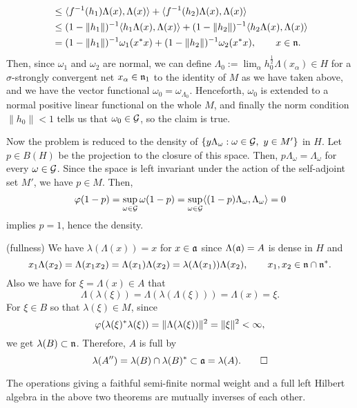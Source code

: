 \documentclass{../../small}
\begin{document}
\begin{pf}
\begin{align*}
&\le\langle f^{-1}(h_1)\Lambda(x),\Lambda(x)\rangle+\langle f^{-1}(h_2)\Lambda(x),\Lambda(x)\rangle\\
&\le(1-\|h_1\|)^{-1}\langle h_1\Lambda(x),\Lambda(x)\rangle+(1-\|h_2\|)^{-1}\langle h_2\Lambda(x),\Lambda(x)\rangle\\
&=(1-\|h_1\|)^{-1}\omega_1(x^*x)+(1-\|h_2\|)^{-1}\omega_2(x^*x),\qquad x\in\mathfrak{n}.
\end{align*}
Then, since $\omega_1$ and $\omega_2$ are normal, we can define $\Lambda_0:=\lim_\alpha h_0^{\frac12}\Lambda(x_\alpha)\in H$ for a $\sigma$-strongly convergent net $x_\alpha\in\mathfrak{n}_1$ to the identity of $M$ as we have taken above, and we have the vector functional $\omega_0=\omega_{\Lambda_0}$.
Henceforth, $\omega_0$ is extended to a normal positive linear functional on the whole $M$, and finally the norm condition $\|h_0\|<1$ tells us that $\omega_0\in\mathcal{G}$, so the claim is true.

Now the problem is reduced to the density of $\{y\Lambda_{\omega}:\omega\in\mathcal{G},\ y\in M'\}$ in $H$.
Let $p\in B(H)$ be the projection to the closure of this space.
Then, $p\Lambda_\omega=\Lambda_\omega$ for every $\omega\in\mathcal{G}$.
Since the space is left invariant under the action of the self-adjoint set $M'$, we have $p\in M$.
Then,
\[\varphi(1-p)=\sup_{\omega\in\mathcal{G}}\omega(1-p)=\sup_{\omega\in\mathcal{G}}\langle(1-p)\Lambda_\omega,\Lambda_\omega\rangle=0\]
implies $p=1$, hence the density.

(fullness)
We have $\lambda(\Lambda(x))=x$ for $x\in\mathfrak{a}$ since $\Lambda(\mathfrak{a})=A$ is dense in $H$ and
\[x_1\Lambda(x_2)=\Lambda(x_1x_2)=\Lambda(x_1)\Lambda(x_2)=\lambda(\Lambda(x_1))\Lambda(x_2),\qquad x_1,x_2\in\mathfrak{n}\cap\mathfrak{n}^*.\]
Also we have for $\xi=\Lambda(x)\in A$ that
\[\Lambda(\lambda(\xi))=\Lambda(\lambda(\Lambda(\xi)))=\Lambda(x)=\xi.\]
For $\xi\in B$ so that $\lambda(\xi)\in M$, since
\[\varphi(\lambda(\xi)^*\lambda(\xi))=\|\Lambda(\lambda(\xi))\|^2=\|\xi\|^2<\infty,\]
we get $\lambda(B)\subset\mathfrak{n}$.
Therefore, $A$ is full by
\[\lambda(A'')=\lambda(B)\cap\lambda(B)^*\subset\mathfrak{a}=\lambda(A).\qedhere\]
\end{pf}

\begin{cor}
The operations giving a faithful semi-finite normal weight and a full left Hilbert algebra in the above two theorems are mutually inverses of each other.
\end{cor}
\end{document}
